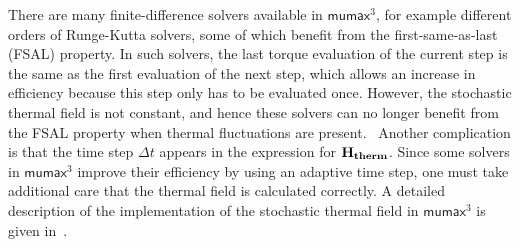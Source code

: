 \documentclass[11pt,a4paper,english]{article}
\newcommand{\mumax}{$\mathsf{mumax}^3$}
\begin{document}
There are many finite-difference solvers available in \mumax{}, for example different orders of Runge-Kutta solvers, some of which benefit from the first-same-as-last (FSAL) property. In such solvers, the last torque evaluation of the current step is the same as the first evaluation of the next step, which allows an increase in efficiency because this step only has to be evaluated once. However, the stochastic thermal field is not constant, and hence these solvers can no longer benefit from the FSAL property when thermal fluctuations are present.~\cite{LEL-17b} Another complication is that the time step $\Delta t$ appears in the expression for $\vb{H_{therm}}$. Since some solvers in \mumax{} improve their efficiency by using an adaptive time step, one must take additional care that the thermal field is calculated correctly. A detailed description of the implementation of the stochastic thermal field in \mumax{} is given in~\cite{LEL-17b}.

\clearpage
\end{document}
